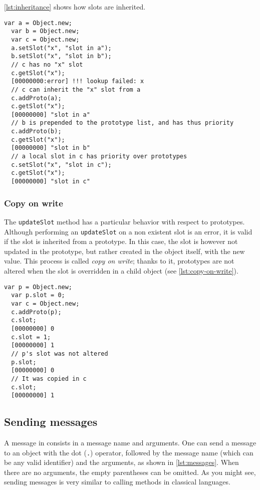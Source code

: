 \documentclass[openright,twoside,12pt]{report}
\begin{document}
\autoref{lst:inheritance} shows how slots are inherited.

\begin{lstlisting}[caption=Slots inheritance, label=lst:inheritance,
  float=\floatpos]
  var a = Object.new;
  var b = Object.new;
  var c = Object.new;
  a.setSlot("x", "slot in a");
  b.setSlot("x", "slot in b");
  // c has no "x" slot
  c.getSlot("x");
  [00000000:error] !!! lookup failed: x
  // c can inherit the "x" slot from a
  c.addProto(a);
  c.getSlot("x");
  [00000000] "slot in a"
  // b is prepended to the prototype list, and has thus priority
  c.addProto(b);
  c.getSlot("x");
  [00000000] "slot in b"
  // a local slot in c has priority over prototypes
  c.setSlot("x", "slot in c");
  c.getSlot("x");
  [00000000] "slot in c"
\end{lstlisting}

\subsubsection{Copy on write}

The \lstinline|updateSlot| method has a particular behavior with
respect to prototypes. Although performing an \lstinline|updateSlot|
on a non existent slot is an error, it is valid if the slot is
inherited from a prototype. In this case, the slot is however not
updated in the prototype, but rather created in the object itself,
with the new value. This process is called {\em copy on write}; thanks
to it, prototypes are not altered when the slot is overridden in a
child object (see \autoref{lst:copy-on-write}).

\begin{lstlisting}[caption=Copy on write, label=lst:copy-on-write,
  float=\floatpos]
  var p = Object.new;
  var p.slot = 0;
  var c = Object.new;
  c.addProto(p);
  c.slot;
  [00000000] 0
  c.slot = 1;
  [00000000] 1
  // p's slot was not altered
  p.slot;
  [00000000] 0
  // It was copied in c
  c.slot;
  [00000000] 1
\end{lstlisting}

\subsection{Sending messages}

A message in \us consists in a message name and arguments. One can
send a message to an object with the dot (\lstinline|.|) operator,
followed by the message name (which can be any valid identifier) and
the arguments, as shown in \autoref{lst:messages}. When there are no
arguments, the empty parentheses can be omitted. As you might see,
sending messages is very similar to calling methods in classical
languages.
\end{document}
